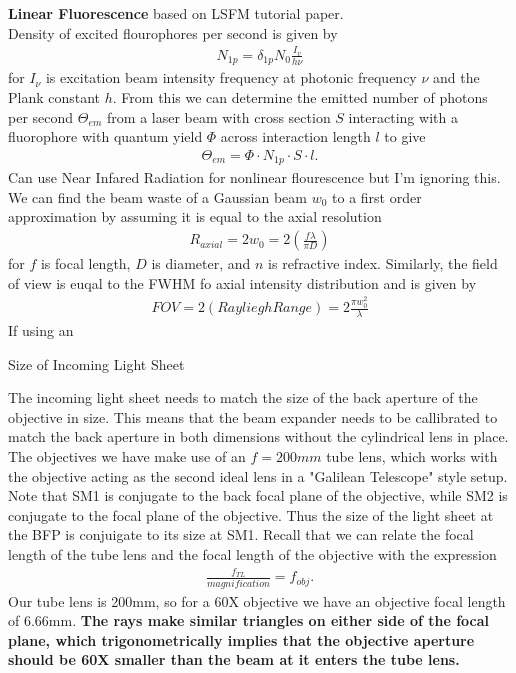 \newpage
\textbf{Linear Fluorescence} based on LSFM tutorial paper.\\
Density of excited flourophores per second is given by 
\begin{gather}
    N_{1p}=\delta_{1p}N_0 \frac{I_v}{h\nu}
\end{gather}
for $I_\nu$ is excitation beam intensity frequency at photonic frequency $\nu$ and the Plank constant $h$. From this we can determine the emitted number of photons per second $\Theta_{em}$ from a laser beam with cross section $S$ interacting with a fluorophore with quantum yield $\Phi$ across interaction length $l$ to give
\begin{gather}
    \Theta_{em} = \Phi \cdot N_{1p} \cdot S \cdot l.
\end{gather}
Can use Near Infared Radiation for nonlinear flourescence but I'm ignoring this.\\
We can find the beam waste of a Gaussian beam $w_0$ to a first order approximation by assuming it is equal to the axial resolution 
\begin{gather}
    R_{axial}=2w_0=2\left( \frac{f\lambda}{\pi D}\right)
\end{gather} 
for $f$ is focal length, $D$ is diameter, and $n$ is refractive index. Similarly, the field of view is euqal to the FWHM fo axial intensity distribution and is given by
\begin{gather}
    FOV=2(RaylieghRange)=2\frac{\pi w_0^2}\lambda
\end{gather}
If using an 
\newpage
\begin{center}
    Size of Incoming Light Sheet
\end{center}
The incoming light sheet needs to match the size of the back aperture of the objective in size. This means that the beam expander needs to be callibrated to match the back aperture in both dimensions without the cylindrical lens in place. The objectives we have make use of an $f=200mm$ tube lens, which works with the objective acting as the second ideal lens in a "Galilean Telescope" style setup. Note that SM1 is conjugate to the back focal plane of the objective, while SM2 is conjugate to the focal plane of the objective. Thus the size of the light sheet at the BFP is conjuigate to its size at SM1. Recall that we can relate the focal length of the tube lens and the focal length of the objective with the expression 
\begin{gather}
     \frac{f_{TL}}{magnification} = f_{obj}.
\end{gather}
Our tube lens is 200mm, so for a 60X objective we have an objective focal length of 6.66mm. \textbf{The rays make similar triangles on either side of the focal plane, which trigonometrically implies that the objective aperture should be 60X smaller than the beam at it enters the tube lens.}
